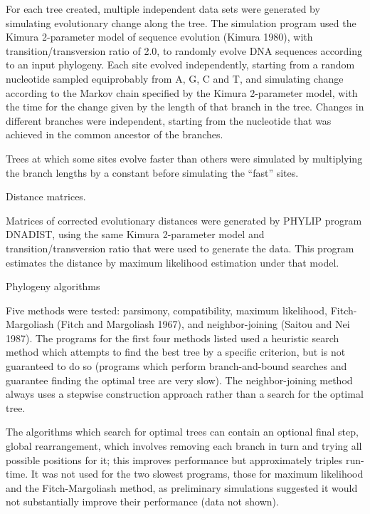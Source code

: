 	For each tree created, multiple independent data sets were 
generated by simulating evolutionary change along the tree.
The simulation program used the Kimura 2-parameter model of 
sequence evolution (Kimura 1980), with transition/transversion 
ratio of 2.0, to randomly evolve DNA sequences according to an input 
phylogeny.  Each site evolved independently, starting from a random
nucleotide sampled equiprobably from A, G, C and T, and simulating
change according to the Markov chain specified by the Kimura 2-parameter
model, with the time for the change given by the length of that branch
in the tree.  Changes in different branches were independent, starting
from the nucleotide that was achieved in the common ancestor of the
branches.

Trees at which some sites evolve faster than others 
were simulated by multiplying the branch lengths by a constant 
before simulating the ``fast'' sites.
\bigskip

\bigskip

\noindent
Distance matrices.
\bigskip


  Matrices of corrected evolutionary 
distances were generated by PHYLIP program DNADIST, using the 
same Kimura 2-parameter model and transition/transversion ratio 
that were used to generate the data.  This program estimates the
distance by maximum likelihood estimation under that model.
\bigskip

\bigskip

\noindent
Phylogeny algorithms
\bigskip


 Five methods were tested:  parsimony, compatibility, maximum
likelihood, Fitch-Margoliash (Fitch and Margoliash 1967), and
neighbor-joining (Saitou and Nei 1987).  The programs for the first four
methods listed used a
heuristic search method which attempts to find the best tree by a 
specific criterion, but is not guaranteed to do so (programs which 
perform branch-and-bound searches and guarantee finding the 
optimal tree are very slow).  The neighbor-joining method always uses
a stepwise construction approach rather than a search for the optimal tree.

	The algorithms which search for optimal trees can contain an 
optional final step, global rearrangement, which involves removing 
each branch in turn and trying all possible positions for it; this 
improves performance but approximately triples run-time.  It was 
not used for the two slowest programs, those for maximum likelihood and
the Fitch-Margoliash method, as preliminary 
simulations suggested it would not substantially improve their 
performance (data not shown).

